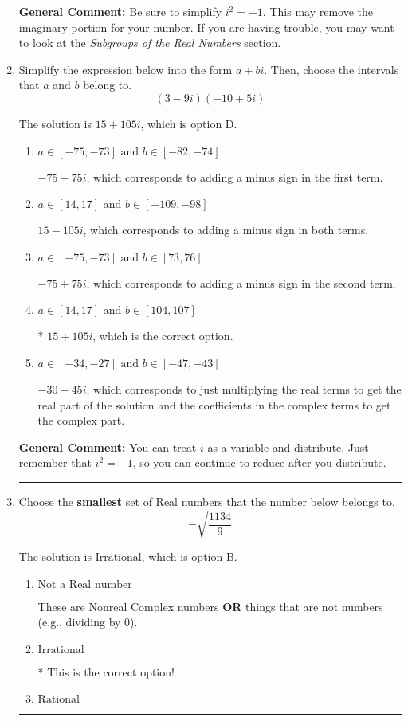 \documentclass{extbook}[14pt]
\newcommand{\litem}[1]{\item #1

\rule{\textwidth}{0.4pt}}
\begin{document}
\begin{enumerate}
{\textbf{General Comment:} Be sure to simplify $i^2 = -1$. This may remove the imaginary portion for your number. If you are having trouble, you may want to look at the \textit{Subgroups of the Real Numbers} section.
}
\litem{
Simplify the expression below into the form $a+bi$. Then, choose the intervals that $a$ and $b$ belong to.
\[ (3 - 9 i)(-10 + 5 i) \]

The solution is \( 15 + 105 i \), which is option D.\begin{enumerate}[label=\Alph*.]
\item \( a \in [-75, -73] \text{ and } b \in [-82, -74] \)

 $-75 - 75 i$, which corresponds to adding a minus sign in the first term.
\item \( a \in [14, 17] \text{ and } b \in [-109, -98] \)

 $15 - 105 i$, which corresponds to adding a minus sign in both terms.
\item \( a \in [-75, -73] \text{ and } b \in [73, 76] \)

 $-75 + 75 i$, which corresponds to adding a minus sign in the second term.
\item \( a \in [14, 17] \text{ and } b \in [104, 107] \)

* $15 + 105 i$, which is the correct option.
\item \( a \in [-34, -27] \text{ and } b \in [-47, -43] \)

 $-30 - 45 i$, which corresponds to just multiplying the real terms to get the real part of the solution and the coefficients in the complex terms to get the complex part.
\end{enumerate}

\textbf{General Comment:} You can treat $i$ as a variable and distribute. Just remember that $i^2=-1$, so you can continue to reduce after you distribute.
}
\litem{
Choose the \textbf{smallest} set of Real numbers that the number below belongs to.
\[ -\sqrt{\frac{1134}{9}} \]

The solution is \( \text{Irrational} \), which is option B.\begin{enumerate}[label=\Alph*.]
\item \( \text{Not a Real number} \)

These are Nonreal Complex numbers \textbf{OR} things that are not numbers (e.g., dividing by 0).
\item \( \text{Irrational} \)

* This is the correct option!
\item \( \text{Rational} \)


\end{enumerate}}
\end{enumerate}
\end{document}
